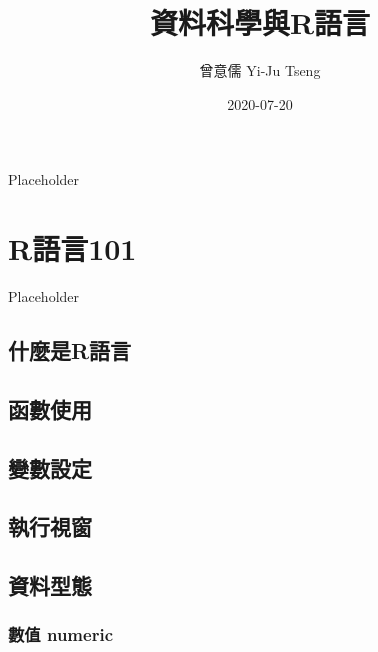 \documentclass[
]{book}
\title{資料科學與R語言}
\author{曾意儒 Yi-Ju Tseng}
\date{2020-07-20}
\begin{document}
\maketitle

{
\hypersetup{linkcolor=}
\setcounter{tocdepth}{1}
\tableofcontents
}
\listoftables
\listoffigures
\hypertarget{preface}{%
\chapter*{}\label{preface}}

Placeholder

\hypertarget{intro}{%
\chapter{R語言101}\label{intro}}

Placeholder

\hypertarget{ux4ec0ux9ebcux662frux8a9eux8a00}{%
\section{什麼是R語言}\label{ux4ec0ux9ebcux662frux8a9eux8a00}}

\hypertarget{ux51fdux6578ux4f7fux7528}{%
\section{函數使用}\label{ux51fdux6578ux4f7fux7528}}

\hypertarget{ux8b8aux6578ux8a2dux5b9a}{%
\section{變數設定}\label{ux8b8aux6578ux8a2dux5b9a}}

\hypertarget{ux57f7ux884cux8996ux7a97}{%
\section{執行視窗}\label{ux57f7ux884cux8996ux7a97}}

\hypertarget{DataType}{%
\section{資料型態}\label{DataType}}

\hypertarget{ux6578ux503c-numeric}{%
\subsection{數值 numeric}\label{ux6578ux503c-numeric}}
\end{document}
